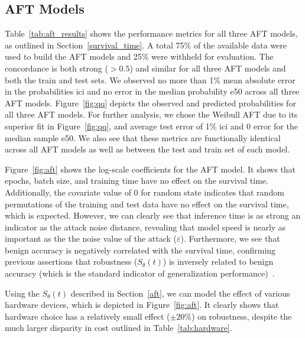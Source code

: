 \documentclass[sn-mathphys-num]{sn-jnl}%
\begin{document}
\subsection{AFT Models}
\label{res:aft}

Table~\ref{tab:aft_results} shows the performance metrics for all three AFT models, as outlined in Section~\ref{survival_time}. A total 75\% of the available data were used to build the AFT models and 25\% were withheld for evaluation. The concordance is both strong ($>0.5$) and similar for all three AFT models and both the train and test sets. We observed no more than 1\% mean absolute error in the probabilities \acrshort{ici} and no error in the median probability \acrshort{e50} across all three AFT models. Figure~\ref{fig:qq} depicts the observed and predicted probabilities for all three AFT models. For further analysis, we chose the Weibull AFT due to its superior fit in Figure~\ref{fig:qq}, and average test error of 1\% \acrshort{ici} and 0 error for the median sample \acrshort{e50}. We also see that these metrics are  functionally identical across all AFT models as well as between the test and train set of each model.

Figure~\ref{fig:aft} shows the log-scale coefficients for the AFT model. It shows that epochs, batch size, and training time have no effect on the survival time. 
Additionally, the covariate value of 0 for random state indicates that random permutations of the training and test data have no effect on the survival time, which is expected. 
However, we can clearly see that inference time  is as strong an indicator as the attack noise distance, revealing that model speed is nearly as important as the the noise value of the attack ($\varepsilon$). 
Furthermore, we see that benign accuracy is negatively correlated with the survival time, confirming previous assertions that robustness ($S_{\theta}(t)$) is inversely related to benign accuracy (which is the standard indicator of generalization performance)~\cite{carlini_towards_2017}.

Using the $S_{\theta}(t)$ described in Section~\ref{aft}, we can model the effect of various hardware devices, which is depicted in Figure~\ref{fig:aft}. 
It clearly shows that hardware choice has a relatively small effect ($\pm 20\%$) on robustness, despite the much larger disparity in cost outlined in Table~\ref{tab:hardware}.
\end{document}
